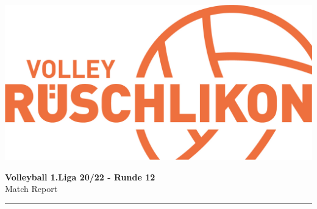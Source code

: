 \documentclass[a4paper,10pt]{scrartcl}
\begin{document}
\begin{minipage}{0.2\linewidth}
  \includegraphics[width=0.8\linewidth]{images/header.jpg}
\end{minipage}
\begin{minipage}[5cm]{0.7\linewidth}
  \textbf{\Large Volleyball 1.Liga 20/22 - Runde 12} \\
  Match Report\\
  \noindent\rule{\textwidth}{1pt}
\end{minipage}
\end{document}
